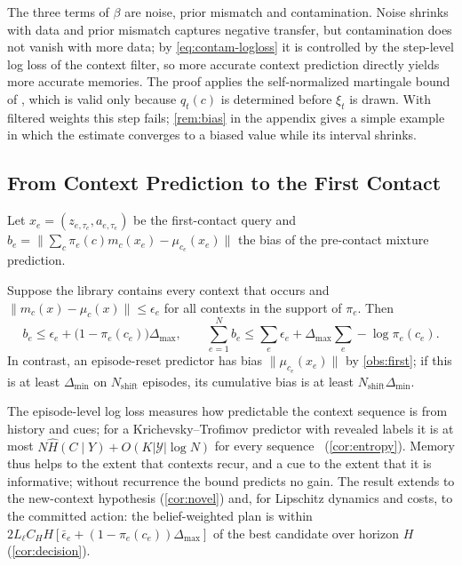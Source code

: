 The three terms of $\beta$ are noise, prior mismatch and contamination. Noise shrinks with data and prior mismatch captures negative transfer, but contamination does not vanish with more data; by \cref{eq:contam-logloss} it is controlled by the step-level log loss of the context filter, so more accurate context prediction directly yields more accurate memories. The proof applies the self-normalized martingale bound of \citet{abbasi2011improved}, which is valid only because $q_t(c)$ is determined before $\xi_t$ is drawn. With filtered weights this step fails; \cref{rem:bias} in the appendix gives a simple example in which the estimate converges to a biased value while its interval shrinks.

\subsection{From Context Prediction to the First Contact}

Let $x_e=(z_{e,\tau_e},a_{e,\tau_e})$ be the first-contact query and $b_e=\|\sum_c\pi_e(c)m_{c}(x_e)-\mu_{c_e}(x_e)\|$ the bias of the pre-contact mixture prediction.

\begin{proposition}\label{prop:first}
Suppose the library contains every context that occurs and $\|m_c(x)-\mu_c(x)\|\le\epsilon_e$ for all contexts in the support of $\pi_e$. Then
\begin{equation}\label{eq:first}
  b_e\le\epsilon_e+\big(1-\pi_e(c_e)\big)\Delta_{\max},\qquad
  \textstyle\sum_{e=1}^{N}b_e\le\sum_e\epsilon_e+\Delta_{\max}\sum_e-\log\pi_e(c_e).
\end{equation}
In contrast, an episode-reset predictor has bias $\|\mu_{c_e}(x_e)\|$ by \cref{obs:first}; if this is at least $\Delta_{\min}$ on $N_{\mathrm{shift}}$ episodes, its cumulative bias is at least $N_{\mathrm{shift}}\Delta_{\min}$.
\end{proposition}

The episode-level log loss measures how predictable the context sequence is from history and cues; for a Krichevsky--Trofimov predictor with revealed labels it is at most $N\widehat H(C\mid Y)+O(K|\mathcal Y|\log N)$ for every sequence~\citep{krichevsky1981performance} (\cref{cor:entropy}). Memory thus helps to the extent that contexts recur, and a cue to the extent that it is informative; without recurrence the bound predicts no gain. The result extends to the new-context hypothesis (\cref{cor:novel}) and, for Lipschitz dynamics and costs, to the committed action: the belief-weighted plan is within $2L_\ell C_HH[\bar\epsilon_e+(1-\pi_e(c_e))\Delta_{\max}]$ of the best candidate over horizon $H$ (\cref{cor:decision}).

